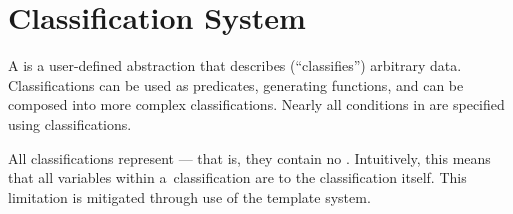 %
%

\section{Classification System}
A  is a user-defined abstraction that describes
  (``classifies'') arbitrary data.
Classifications can be used as predicates, generating functions, and can be
  composed into more complex classifications.
Nearly all conditions in \tame{} are specified using classifications.

All classifications represent ---%
  that is,
    they contain no .
Intuitively,
  this means that all variables within a~classification are
   to the classification itself.
This limitation is mitigated through use of the template system.

